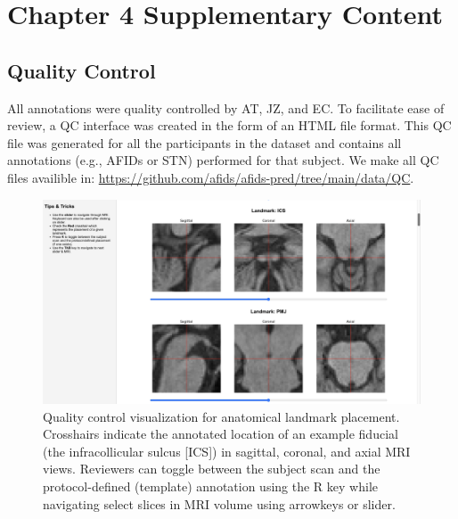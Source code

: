 \chapter{Chapter 4 Supplementary Content}\label{app:suppcontentch4}
\newpage

\section{Quality Control}\label{app:qualitycontrol}
All annotations were quality controlled by AT, JZ, and EC. To facilitate ease of review, a QC interface was created in the form of an HTML file format. This QC file was generated for all the participants in the dataset and contains all annotations (e.g., AFIDs or STN) performed for that subject. We make all QC files availible in: \url{https://github.com/afids/afids-pred/tree/main/data/QC}.

\begin{figure}[hbt!]
    \centering
    \includegraphics[width=0.95\linewidth]{figs/figuresupQC.png}
    \caption{Quality control visualization for anatomical landmark placement. Crosshairs indicate the annotated location of an example fiducial (the infracollicular sulcus [ICS]) in sagittal, coronal, and axial MRI views. Reviewers can toggle between the subject scan and the protocol-defined (template) annotation using the R key while navigating select slices in MRI volume using arrowkeys or slider.}
    \label{fig:figuresupQC}
\end{figure}